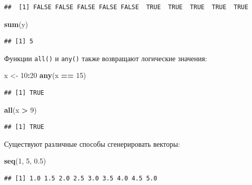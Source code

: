\documentclass[
]{book}
\newenvironment{Shaded}{\begin{snugshade}}{\end{snugshade}}
\newcommand{\DecValTok}[1]{\textcolor[rgb]{0.00,0.00,0.81}{#1}}
\newcommand{\FloatTok}[1]{\textcolor[rgb]{0.00,0.00,0.81}{#1}}
\newcommand{\FunctionTok}[1]{\textcolor[rgb]{0.13,0.29,0.53}{\textbf{#1}}}
\newcommand{\NormalTok}[1]{#1}
\newcommand{\OtherTok}[1]{\textcolor[rgb]{0.56,0.35,0.01}{#1}}
\newcommand{\SpecialCharTok}[1]{\textcolor[rgb]{0.81,0.36,0.00}{\textbf{#1}}}
\theoremstyle{definition}
\theoremstyle{definition}
\theoremstyle{definition}
\theoremstyle{definition}
\theoremstyle{remark}
\begin{document}
\begin{verbatim}
##  [1] FALSE FALSE FALSE FALSE FALSE  TRUE  TRUE  TRUE  TRUE  TRUE
\end{verbatim}

\begin{Shaded}
\begin{Highlighting}[]
\FunctionTok{sum}\NormalTok{(y)}
\end{Highlighting}
\end{Shaded}

\begin{verbatim}
## [1] 5
\end{verbatim}

Функции \texttt{all()} и \texttt{any()} также возвращают логические значения:

\begin{Shaded}
\begin{Highlighting}[]
\NormalTok{x }\OtherTok{\textless{}{-}} \DecValTok{10}\SpecialCharTok{:}\DecValTok{20} 
\FunctionTok{any}\NormalTok{(x }\SpecialCharTok{==} \DecValTok{15}\NormalTok{)}
\end{Highlighting}
\end{Shaded}

\begin{verbatim}
## [1] TRUE
\end{verbatim}

\begin{Shaded}
\begin{Highlighting}[]
\FunctionTok{all}\NormalTok{(x }\SpecialCharTok{\textgreater{}} \DecValTok{9}\NormalTok{)}
\end{Highlighting}
\end{Shaded}

\begin{verbatim}
## [1] TRUE
\end{verbatim}

Существуют различные способы сгенерировать векторы:

\begin{Shaded}
\begin{Highlighting}[]
\FunctionTok{seq}\NormalTok{(}\DecValTok{1}\NormalTok{, }\DecValTok{5}\NormalTok{, }\FloatTok{0.5}\NormalTok{)}
\end{Highlighting}
\end{Shaded}

\begin{verbatim}
## [1] 1.0 1.5 2.0 2.5 3.0 3.5 4.0 4.5 5.0
\end{verbatim}
\end{document}
